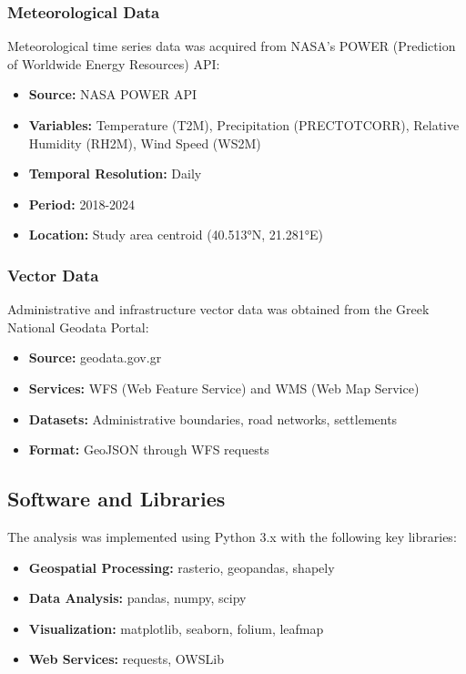 \documentclass[a4paper,12pt]{article}
\begin{document}
\subsubsection{Meteorological Data}

Meteorological time series data was acquired from NASA's POWER (Prediction of
Worldwide Energy Resources) API:

\begin{itemize}
    \item \textbf{Source:} NASA POWER API
    \item \textbf{Variables:} Temperature (T2M), Precipitation (PRECTOTCORR), Relative Humidity (RH2M), Wind Speed (WS2M)
    \item \textbf{Temporal Resolution:} Daily
    \item \textbf{Period:} 2018-2024
    \item \textbf{Location:} Study area centroid (40.513°N, 21.281°E)
\end{itemize}

\subsubsection{Vector Data}

Administrative and infrastructure vector data was obtained from the Greek
National Geodata Portal:

\begin{itemize}
    \item \textbf{Source:} geodata.gov.gr
    \item \textbf{Services:} WFS (Web Feature Service) and WMS (Web Map Service)
    \item \textbf{Datasets:} Administrative boundaries, road networks, settlements
    \item \textbf{Format:} GeoJSON through WFS requests
\end{itemize}

\subsection{Software and Libraries}

The analysis was implemented using Python 3.x with the following key libraries:

\begin{itemize}
    \item \textbf{Geospatial Processing:} rasterio, geopandas, shapely
    \item \textbf{Data Analysis:} pandas, numpy, scipy
    \item \textbf{Visualization:} matplotlib, seaborn, folium, leafmap
    \item \textbf{Web Services:} requests, OWSLib
\end{itemize}
\end{document}
